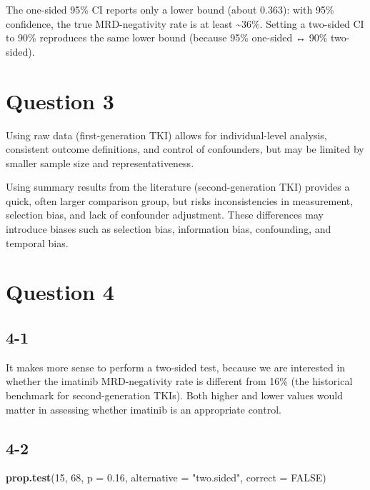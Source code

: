 \documentclass[
]{article}
\newenvironment{Shaded}{\begin{snugshade}}{\end{snugshade}}
\newcommand{\AttributeTok}[1]{\textcolor[rgb]{0.13,0.29,0.53}{#1}}
\newcommand{\ConstantTok}[1]{\textcolor[rgb]{0.56,0.35,0.01}{#1}}
\newcommand{\DecValTok}[1]{\textcolor[rgb]{0.00,0.00,0.81}{#1}}
\newcommand{\FloatTok}[1]{\textcolor[rgb]{0.00,0.00,0.81}{#1}}
\newcommand{\FunctionTok}[1]{\textcolor[rgb]{0.13,0.29,0.53}{\textbf{#1}}}
\newcommand{\NormalTok}[1]{#1}
\newcommand{\StringTok}[1]{\textcolor[rgb]{0.31,0.60,0.02}{#1}}
\begin{document}
The one-sided 95\% CI reports only a lower bound (about 0.363): with
95\% confidence, the true MRD-negativity rate is at least
\textasciitilde36\%. Setting a two-sided CI to 90\% reproduces the same
lower bound (because 95\% one-sided ↔ 90\% two-sided).

\section{Question 3}\label{question-3}

Using raw data (first-generation TKI) allows for individual-level
analysis, consistent outcome definitions, and control of confounders,
but may be limited by smaller sample size and representativeness.

Using summary results from the literature (second-generation TKI)
provides a quick, often larger comparison group, but risks
inconsistencies in measurement, selection bias, and lack of confounder
adjustment. These differences may introduce biases such as selection
bias, information bias, confounding, and temporal bias.

\section{Question 4}\label{question-4}

\subsection{4-1}\label{section-6}

It makes more sense to perform a two-sided test, because we are
interested in whether the imatinib MRD-negativity rate is different from
16\% (the historical benchmark for second-generation TKIs). Both higher
and lower values would matter in assessing whether imatinib is an
appropriate control.

\subsection{4-2}\label{section-7}

\begin{Shaded}
\begin{Highlighting}[]
\FunctionTok{prop.test}\NormalTok{(}\DecValTok{15}\NormalTok{, }\DecValTok{68}\NormalTok{, }\AttributeTok{p =} \FloatTok{0.16}\NormalTok{,}
          \AttributeTok{alternative =} \StringTok{"two.sided"}\NormalTok{, }\AttributeTok{correct =} \ConstantTok{FALSE}\NormalTok{)}
\end{Highlighting}
\end{Shaded}
\end{document}
